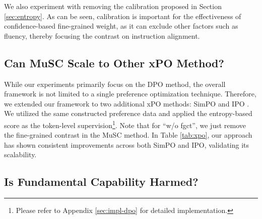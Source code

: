 We also experiment with removing the calibration proposed in Section \ref{sec:entropy}. As can be seen, calibration is important for the effectiveness of confidence-based fine-grained weight, as it can exclude other factors such as fluency, thereby focusing the contrast on instruction alignment.

\subsection{Can MuSC Scale to Other xPO Method?}
While our experiments primarily focus on the DPO method, the overall framework is not limited to a single preference optimization technique. Therefore, we extended our framework to two additional xPO methods: SimPO \cite{meng2024simpo} and IPO \cite{azar2024general}. We utilized the same constructed preference data and applied the entropy-based score as the token-level supervision\footnote{Please refer to Appendix \ref{sec:impl-dpo} for detailed implementation.}.
Note that for ``w/o fgct'', we just remove the fine-grained contrast in the MuSC method.
In Table \ref{tab:xpo}, our approach has shown consistent improvements across both SimPO and IPO, validating its scalability. 

\subsection{Is Fundamental Capability Harmed?}

